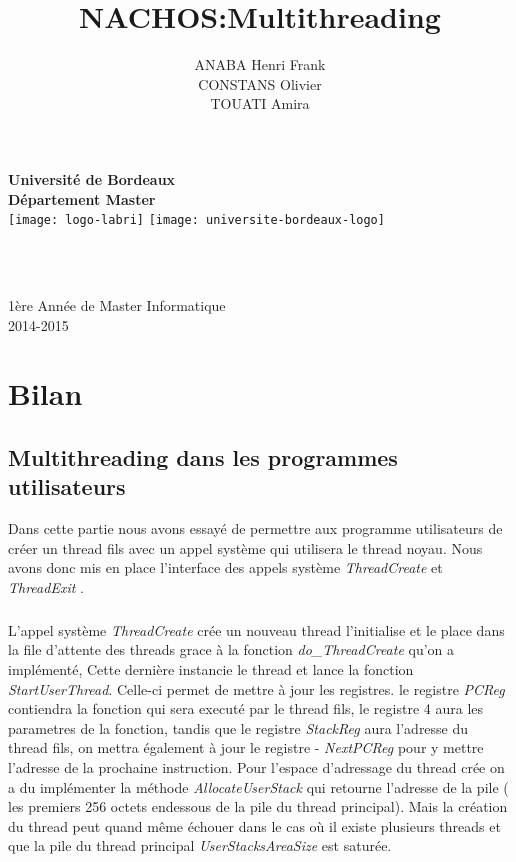 \documentclass[12pt, a4paper]{report}
\title{NACHOS:Multithreading}
\author{
	ANABA Henri Frank\\
	CONSTANS Olivier\\
	TOUATI Amira
	}
\begin{document}
\makeatletter
  \begin{titlepage}
  \centering
      {\large\textbf{	Université de Bordeaux\\
       Département Master}}\\
      \texttt{[image: logo-labri]}
      \hfill
      \texttt{[image: universite-bordeaux-logo]}\\
    \vspace{4cm}
      
       {\LARGE \textbf{\@title}} \\
    \vspace{2cm}
   
    \vspace{4em}
        {\large \@author} \\
    \vfill
    	{\large 1ère Année de Master Informatique}\\
    	{\large \textsc{2014-2015}}\\
    
    \end{titlepage}


\tableofcontents



\chapter{Bilan}


\section{Multithreading dans les programmes utilisateurs}

Dans cette partie nous avons essayé de permettre aux programme utilisateurs de créer un thread fils avec un appel système qui utilisera le thread noyau. Nous avons donc mis en place l'interface des appels système  \textit{ ThreadCreate } et \textit{ ThreadExit }.
	\paragraph{}
 L'appel système \textit{ ThreadCreate } crée un nouveau thread l'initialise et le place dans la file d'attente des threads grace à la fonction  \textit{ do\_ThreadCreate } qu'on a implémenté, Cette dernière instancie le thread et lance la fonction  \textit{ StartUserThread}. Celle-ci permet de mettre à jour les registres. le registre \textit{ PCReg } contiendra la fonction qui sera executé par le thread fils, le registre 4  aura les parametres de la fonction, tandis que le registre \textit{StackReg } aura l'adresse du thread fils, on mettra également à jour le registre -\textit{ NextPCReg } pour y mettre l'adresse de la prochaine instruction.
Pour l'espace d'adressage du thread crée on a du implémenter la méthode  \textit{ AllocateUserStack} qui retourne l'adresse de la pile ( les premiers 256 octets endessous de la pile du thread principal). Mais la création du thread peut quand même échouer dans le cas où il existe plusieurs threads et que la pile du thread principal \textit{ UserStacksAreaSize } est saturée.
\end{document}
